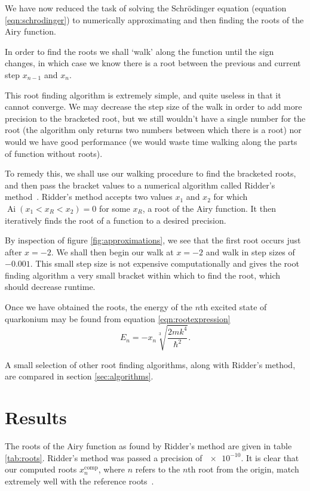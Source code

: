\documentclass[]{article}
\newcommand{\Ai}[1]{\ensuremath{\operatorname{Ai}({#1})}}
\begin{document}
We have now reduced the task of solving the Schr\"{o}dinger equation (equation \ref{eqn:schrodinger}) to numerically approximating and then finding the roots of the Airy function.

In order to find the roots we shall `walk' along the function until the sign changes, in which case we know there is a root between the previous and current step $x_{n-1}$ and $x_{n}$.

This root finding algorithm is extremely simple, and quite useless in that it cannot converge. We may decrease the step size of the walk in order to add more precision to the bracketed root, but we still wouldn't have a single number for the root (the algorithm only returns two numbers between which there is a root) nor would we have good performance (we would waste time walking along the parts of function without roots).

To remedy this, we shall use our walking procedure to find the bracketed roots, and then pass the bracket values to a numerical algorithm called Ridder's method~\cite{ref:nr}. Ridder's method accepts two values $x_{1}$ and $x_{2}$ for which $\Ai{x_{1} < x_{R} < x_{2}} = 0$ for some $x_{R}$, a root of the Airy function. It then iteratively finds the root of a function to a desired precision.

By inspection of figure \ref{fig:approximations}, we see that the first root occurs just after $x = -2$. We shall then begin our walk at $x = -2$ and walk in step sizes of $-0.001$. This small step size is not expensive computationally and gives the root finding algorithm a very small bracket within which to find the root, which should decrease runtime. 

Once we have obtained the roots, the energy of the $n$th excited state of quarkonium may be found from equation \ref{eqn:rootexpression}
\begin{equation}
E_{n} = -x_{n} \sqrt[3]{\frac{2mk^{4}}{\hbar^{2}}}.
\end{equation}

A small selection of other root finding algorithms, along with Ridder's method, are compared in section \ref{sec:algorithms}.



\section{Results}\label{sec:results}

The roots of the Airy function as found by Ridder's method are given in table \ref{tab:roots}.   Ridder's method was passed a precision of $\num{e-10}$. It is clear that our computed roots $x_{n}^{\mathrm{comp}}$, where $n$ refers to the $n$th root from the origin, match extremely well with the reference roots~\cite{ref:abramowitz}.
\end{document}
